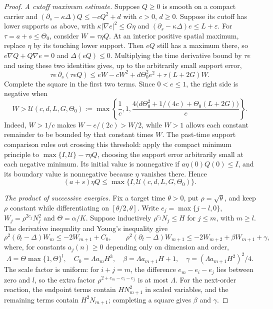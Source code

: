 \begin{proof}
\emph{A cutoff maximum estimate.}
Suppose $Q\geq0$ is smooth on a compact carrier and
$(\partial_s-\kappa\Delta)Q\leq-cQ^2+d$ with $c>0$, $d\geq0$.
Suppose its cutoff has lower supports as above, with
$\kappa|\nabla e|^2\leq G\eta$ and
$(\partial_s-\kappa\Delta)e\leq L+\varepsilon$.
For $\tau=a+s\leq\Theta_0$, consider $W=\tau\eta Q$.
At an interior positive spatial maximum, replace $\eta$ by its
touching lower support.  Then $eQ$ still has a maximum there, so
$e\nabla Q+Q\nabla e=0$ and $\Delta(eQ)\leq0$.
Multiplying the time derivative bound by $\tau e$ and using these
two identities gives, up to the arbitrarily small support error,
\[
 \tau e\,\partial_s(\tau eQ)
 \leq eW-cW^2+d\Theta_0^2e^2+\tau(L+2G)W.
\]
Complete the square in the first two terms.  Since $0<e\leq1$, the
right side is negative when
\[
 W>\mathcal U(c,d,L,G,\Theta_0):=
 \max\left\{\frac1c,1,
   \frac{4\bigl(d\Theta_0^2+1/(4c)+\Theta_0(L+2G)\bigr)}c\right\}.
\]
Indeed, $W>1/c$ makes $W-e/(2c)>W/2$, while $W>1$ allows each
constant remainder to be bounded by that constant times $W$.
The past-time support comparison rules out crossing this threshold:
apply the compact minimum principle to
$\max\{I,\mathcal U\}-\tau\eta Q$, choosing the support error
arbitrarily small at each negative minimum.  Its initial value is
nonnegative if $a\eta(0)Q(0)\leq I$, and its boundary value is
nonnegative because $\eta$ vanishes there.  Hence
\begin{equation}\label{eq:rf-shi-cutoff-bound}
 (a+s)\eta Q\leq\max\{I,\mathcal U(c,d,L,G,\Theta_0)\}.
\end{equation}

\emph{The product of successive energies.}
Fix a target time $\theta>0$, put $\rho=\sqrt\theta$, and keep $\rho$
constant while differentiating on $[\theta/2,\theta]$.  Write
$e_j=\max\{j-l,0\}$, $W_j=\rho^{2e_j}N_j^2$ and $\Theta=\alpha/K$.
Suppose inductively $\rho^{e_j}N_j\leq H$ for $j\leq m$, with
$m\geq l$.  The derivative inequality and Young's inequality give
\[
 \rho^2(\partial_t-\Delta)W_m\leq-2W_{m+1}+C_0,
 \qquad
 \rho^2(\partial_t-\Delta)W_{m+1}
      \leq-2W_{m+2}+\beta W_{m+1}+\gamma,
\]
where, for constants $a_j(n)\geq0$ depending only on dimension and order,
\[
 \Lambda=\Theta\max\{1,\Theta\}^{l},\quad
 C_0=\Lambda a_mH^3,\quad
 \beta=\Lambda a_{m+1}H+1,\quad
 \gamma=(\Lambda a_{m+1}H^2)^2/4.
\]
The scale factor is uniform: for $i+j=m$, the difference
$e_m-e_i-e_j$ lies between zero and $l$, so the extra factor
$\rho^{2+e_m-e_i-e_j}$ is at most $\Lambda$.
For the next-order reaction, the endpoint terms contain
$HN_{m+1}^2$ in scaled variables, and the remaining terms contain
$H^2N_{m+1}$; completing a square gives $\beta$ and $\gamma$.


\end{proof}
